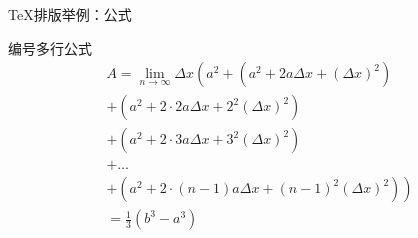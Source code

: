 \begin{frame}{\TeX{}排版举例：公式}
  \begin{alertblock}{编号多行公式}
    \begin{multline}
      A=\lim_{n\rightarrow\infty}\Delta x\left(a^{2}+\left(a^{2}+2a\Delta
      x+\left(\Delta x\right)^{2}\right)\right.\label{eq:reset}\\
      +\left(a^{2}+2\cdot2a\Delta x+2^{2}\left(\Delta x\right)^{2}\right)\\
      +\left(a^{2}+2\cdot3a\Delta x+3^{2}\left(\Delta x\right)^{2}\right)\\
      +\ldots\\
      \left.+\left(a^{2}+2\cdot(n-1)a\Delta x+(n-1)^{2}\left(\Delta
      x\right)^{2}\right)\right)\\
      =\frac{1}{3}\left(b^{3}-a^{3}\right)
    \end{multline}
  \end{alertblock}
\end{frame}

